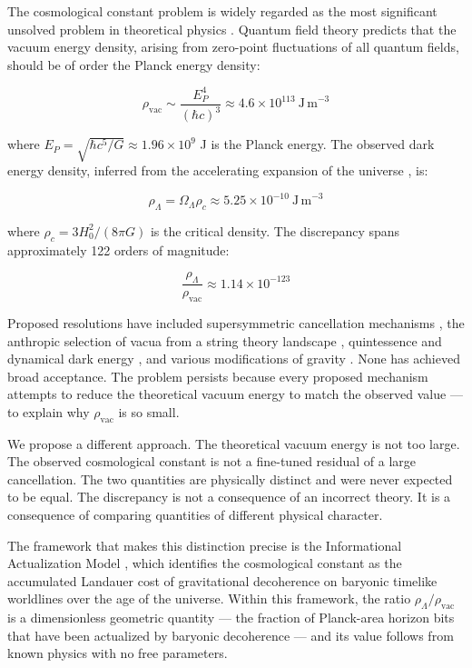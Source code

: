 \documentclass[12pt,a4paper]{article}
\begin{document}
The cosmological constant problem is widely regarded as the most
significant unsolved problem in theoretical physics
\citep{weinberg1989,martin2012}. Quantum field theory predicts that the
vacuum energy density, arising from zero-point fluctuations of all
quantum fields, should be of order the Planck energy density:

\begin{equation}
\rho_\mathrm{vac} \sim \frac{E_P^4}{(\hbar c)^3} \approx
4.6 \times 10^{113}\ \mathrm{J\,m}^{-3}
\label{eq:rho_vac}
\end{equation}

where $E_P = \sqrt{\hbar c^5/G} \approx 1.96 \times 10^9$ J is the
Planck energy. The observed dark energy density, inferred from the
accelerating expansion of the universe \citep{riess1998,perlmutter1999},
is:

\begin{equation}
\rho_\Lambda = \Omega_\Lambda \rho_c \approx 5.25 \times 10^{-10}\
\mathrm{J\,m}^{-3}
\label{eq:rho_Lambda}
\end{equation}

where $\rho_c = 3H_0^2/(8\pi G)$ is the critical density. The
discrepancy spans approximately 122 orders of magnitude:

\begin{equation}
\frac{\rho_\Lambda}{\rho_\mathrm{vac}} \approx 1.14 \times 10^{-123}
\label{eq:ratio_observed}
\end{equation}

Proposed resolutions have included supersymmetric cancellation mechanisms
\citep{witten2000}, the anthropic selection of vacua from a string theory
landscape \citep{bousso2000}, quintessence and dynamical dark energy
\citep{caldwell1998}, and various modifications of gravity
\citep{weinberg1989}. None has achieved broad acceptance. The problem
persists because every proposed mechanism attempts to reduce the
theoretical vacuum energy to match the observed value — to explain why
$\rho_\mathrm{vac}$ is so small.

We propose a different approach. The theoretical vacuum energy is not
too large. The observed cosmological constant is not a fine-tuned residual
of a large cancellation. The two quantities are physically distinct and
were never expected to be equal. The discrepancy is not a consequence of
an incorrect theory. It is a consequence of comparing quantities of
different physical character.

The framework that makes this distinction precise is the Informational
Actualization Model \citep{mahaffey2026}, which identifies the
cosmological constant as the accumulated Landauer cost of gravitational
decoherence on baryonic timelike worldlines over the age of the universe.
Within this framework, the ratio $\rho_\Lambda/\rho_\mathrm{vac}$ is a
dimensionless geometric quantity — the fraction of Planck-area horizon
bits that have been actualized by baryonic decoherence — and its value
follows from known physics with no free parameters.
\end{document}
